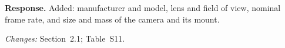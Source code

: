 \textbf{Response.} Added: manufacturer and model, lens and field of view, nominal frame rate, and size and mass of the camera and its mount.

\textit{Changes:} Section~2.1; Table~S11.

